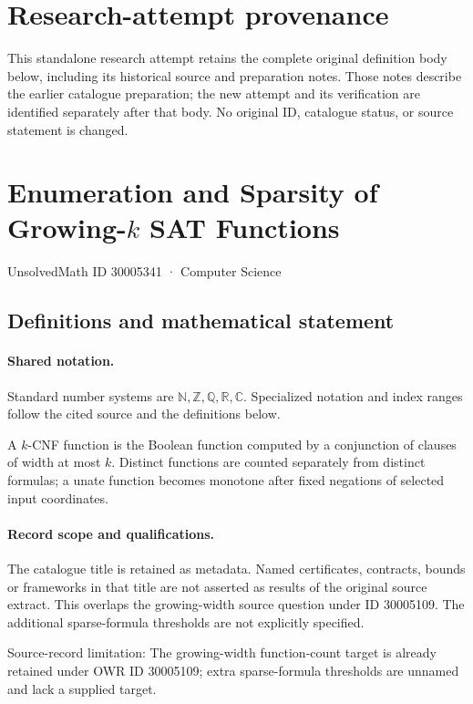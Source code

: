 \documentclass[11pt]{article}
\begin{document}
\section*{Research-attempt provenance}
This standalone research attempt retains the complete original definition body below,
including its historical source and preparation notes. Those notes describe the
earlier catalogue preparation; the new attempt and its verification are identified
separately after that body. No original ID, catalogue status, or source statement is changed.

\section{Enumeration and Sparsity of Growing-$k$ SAT Functions}\label{30005341}
{\small UnsolvedMath ID 30005341 · Computer Science}
\subsection{Definitions and mathematical statement}

\paragraph{Shared notation.}Standard number systems are $\mathbb N,\mathbb Z,\mathbb Q,\mathbb R,\mathbb C$. Specialized notation and index ranges follow the cited source and the definitions below.


A $k$-CNF function is the Boolean function computed by a conjunction of clauses of width at most $k$. Distinct functions are counted separately from distinct formulas; a unate function becomes monotone after fixed negations of selected input coordinates.
\paragraph{Record scope and qualifications.}
The catalogue title is retained as metadata. Named certificates, contracts, bounds or frameworks in that title are not asserted as results of the original source extract.
This overlaps the growing-width source question under ID 30005109. The additional sparse-formula thresholds are not explicitly specified.

Source-record limitation: The growing-width function-count target is already retained under OWR ID 30005109; extra sparse-formula thresholds are unnamed and lack a supplied target.
\end{document}
